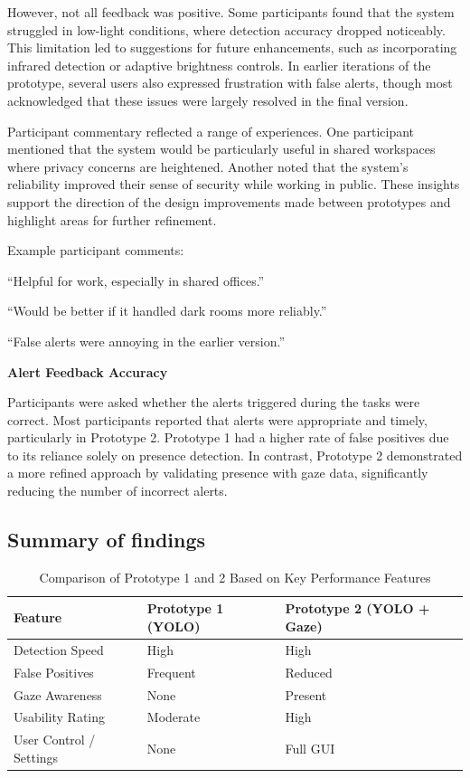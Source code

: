 \documentclass[12pt]{article}
\theoremstyle{plain}
\theoremstyle{definition}
\begin{document}
However, not all feedback was positive. Some participants found that the system struggled in low-light conditions, where detection accuracy dropped noticeably. This limitation led to suggestions for future enhancements, such as incorporating infrared detection or adaptive brightness controls. In earlier iterations of the prototype, several users also expressed frustration with false alerts, though most acknowledged that these issues were largely resolved in the final version.

Participant commentary reflected a range of experiences. One participant mentioned that the system would be particularly useful in shared workspaces where privacy concerns are heightened. Another noted that the system’s reliability improved their sense of security while working in public. These insights support the direction of the design improvements made between prototypes and highlight areas for further refinement.

Example participant comments:

“Helpful for work, especially in shared offices.”

“Would be better if it handled dark rooms more reliably.”

“False alerts were annoying in the earlier version.”

\textbf{Alert Feedback Accuracy}

Participants were asked whether the alerts triggered during the tasks were correct. Most participants reported that alerts were appropriate and timely, particularly in Prototype 2. Prototype 1 had a higher rate of false positives due to its reliance solely on presence detection. In contrast, Prototype 2 demonstrated a more refined approach by validating presence with gaze data, significantly reducing the number of incorrect alerts.


\subsection{Summary of findings}

\begin{table}[h]
\centering
\caption{Comparison of Prototype 1 and 2 Based on Key Performance Features}
\begin{tabular}{|l|l|l|}
\hline
\textbf{Feature} & \textbf{Prototype 1 (YOLO)} & \textbf{Prototype 2 (YOLO + Gaze)} \\
\hline
Detection Speed & High & High \\
False Positives & Frequent & Reduced \\
Gaze Awareness & None & Present \\
Usability Rating & Moderate & High \\
User Control / Settings & None & Full GUI \\
\hline
\end{tabular}
\label{tab:prototype_comparison}
\end{table}
\end{document}
